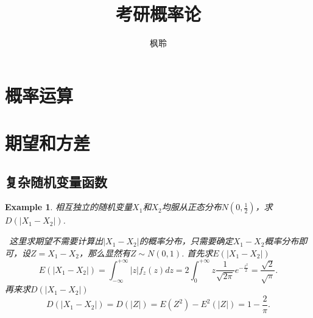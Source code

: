 \documentclass{article}
\newtheorem{example}[theorem]{Example}
\newcommand{\hints}{{\color{blue} \text{hints}}}
\begin{document}
\title{考研概率论}
\author{枫聆}
\maketitle

\tableofcontents

\newpage
\section{概率运算}

\newpage
\section{期望和方差}

\subsection{复杂随机变量函数}

\begin{example}
\rm 相互独立的随机变量$X_1$和$X_2$均服从正态分布$N(0,\frac{1}{2})$，求$D(|X_1 - X_2|)$. 

\hints\ 这里求期望不需要计算出$|X_1-X_2|$的概率分布，只需要确定$X_1 - X_2$概率分布即可，设$Z= X_1 - X_2$，那么显然有$Z \sim N(0,1)$. 首先求$E(|X_1-X_2|)$
$$
E(|X_1-X_2|) = \int_{-\infty}^{+\infty} |z|f_z(z)dz = 2\int_0^{+\infty} z\frac{1}{\sqrt{2\pi}}e^{-\frac{z^2}{2}} = \frac{\sqrt{2}}{\sqrt{\pi}}.
$$
再来求$D(|X_1 - X_2|)$
$$
D(|X_1 - X_2|) = D(|Z|) = E(Z^2) - E^2(|Z|) = 1-\frac{2}{\pi}.
$$
\end{example}
\end{document}
